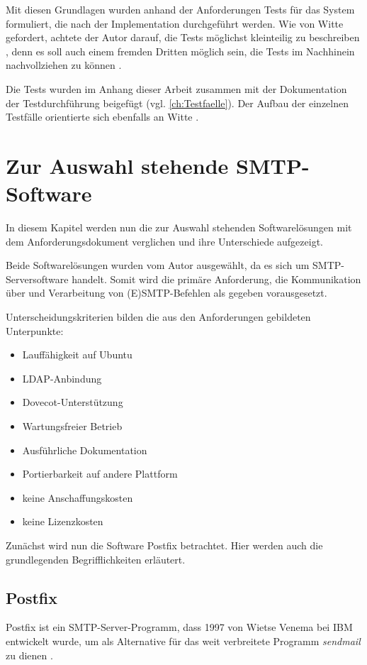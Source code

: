 Mit diesen Grundlagen wurden anhand der Anforderungen Tests für das System formuliert, die nach der Implementation durchgeführt werden. 
Wie von Witte gefordert, achtete der Autor darauf, die Tests möglichst kleinteilig zu beschreiben , denn es soll auch einem fremden Dritten möglich sein, die Tests im Nachhinein nachvollziehen zu können \citep[vgl.][S. 162 f.]{Witte2019}. 

Die Tests wurden im Anhang dieser Arbeit zusammen mit der Dokumentation der Testdurchführung beigefügt (vgl. \autoref{ch:Testfaelle}). Der Aufbau der einzelnen Testfälle orientierte sich ebenfalls an Witte \citep[vgl.][162]{Witte2019}.


\chapter{Zur Auswahl stehende SMTP-Software}
\label{sec:Auswahl}
In diesem Kapitel werden nun die zur Auswahl stehenden Softwarelösungen mit dem Anforderungsdokument verglichen und ihre Unterschiede aufgezeigt. 

Beide Softwarelösungen wurden vom Autor ausgewählt, da es sich um SMTP-Serversoftware handelt. Somit wird die primäre Anforderung, die Kommunikation über und Verarbeitung von (E)SMTP-Befehlen als gegeben vorausgesetzt.

Unterscheidungskriterien bilden die aus den Anforderungen gebildeten Unterpunkte:
\begin{itemize}
	\item Lauffähigkeit auf Ubuntu
	\item LDAP-Anbindung
	\item Dovecot-Unterstützung
	\item Wartungsfreier Betrieb
	\item Ausführliche Dokumentation
	\item Portierbarkeit auf andere Plattform
	\item keine Anschaffungskosten
	\item keine Lizenzkosten
\end{itemize}

Zunächst wird nun die Software Postfix betrachtet. Hier werden auch die grundlegenden Begrifflichkeiten erläutert.

\section{Postfix}
Postfix ist ein SMTP-Server-Programm, dass 1997  von Wietse Venema bei IBM entwickelt wurde, um als Alternative für das weit verbreitete Programm \textit{sendmail} zu dienen \citep[vgl.][307]{Deimeke2019}.

